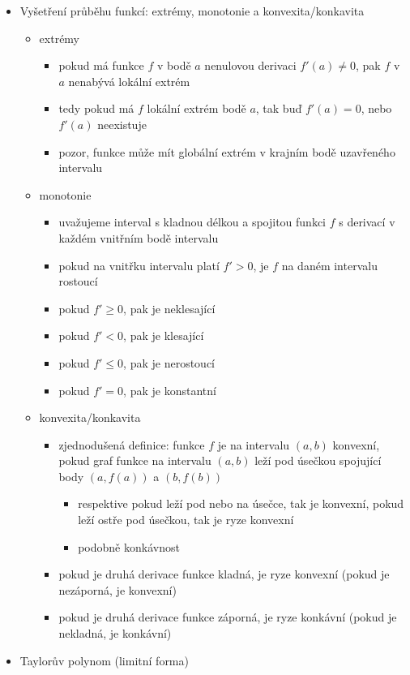 \begin{itemize}
\begin{itemize}
\end{itemize}
\item Vyšetření průběhu funkcí: extrémy, monotonie a konvexita/konkavita
\begin{itemize}
\item extrémy
\begin{itemize}
\item pokud má funkce $f$ v bodě $a$ nenulovou derivaci $f'(a)\neq 0$, pak $f$ v $a$ nenabývá lokální extrém
\item tedy pokud má $f$ lokální extrém bodě $a$, tak buď $f'(a)=0$, nebo $f'(a)$ neexistuje
\item pozor, funkce může mít globální extrém v krajním bodě uzavřeného intervalu
\end{itemize}
\item monotonie
\begin{itemize}
\item uvažujeme interval s kladnou délkou a spojitou funkci $f$ s derivací v každém vnitřním bodě intervalu
\item pokud na vnitřku intervalu platí $f'\gt 0$, je $f$ na daném intervalu rostoucí
\item pokud $f'\geq 0$, pak je neklesající
\item pokud $f'\lt 0$, pak je klesající
\item pokud $f'\leq 0$, pak je nerostoucí
\item pokud $f'=0$, pak je konstantní
\end{itemize}
\item konvexita/konkavita
\begin{itemize}
\item zjednodušená definice: funkce $f$ je na intervalu $(a,b)$ konvexní, pokud graf funkce na intervalu $(a,b)$ leží pod úsečkou spojující body $(a,f(a))$ a $(b,f(b))$
\begin{itemize}
\item respektive pokud leží pod nebo na úsečce, tak je konvexní, pokud leží ostře pod úsečkou, tak je ryze konvexní
\item podobně konkávnost
\end{itemize}
\item pokud je druhá derivace funkce kladná, je ryze konvexní (pokud je nezáporná, je konvexní)
\item pokud je druhá derivace funkce záporná, je ryze konkávní (pokud je nekladná, je konkávní)
\end{itemize}
\end{itemize}
\item Taylorův polynom (limitní forma)

\end{itemize}
